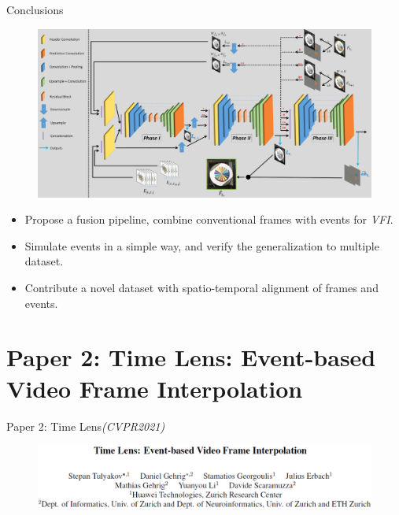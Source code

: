 \documentclass[aspectratio=43]{beamer}
\begin{document}
	\begin{frame}{Conclusions}
		\begin{figure}
			\centering\includegraphics[width=0.85\linewidth]{images/EFI_NET_architecture.png}
		\end{figure}
		\begin{itemize}
			\item Propose a \alert{fusion pipeline}, combine conventional frames with \alert{events} for \textit{VFI}.
			\item \alert{Simulate events} in a simple way, and verify the \alert{generalization} to multiple dataset.
			\item \alert{Contribute a novel dataset} with spatio-temporal alignment of frames and events.
		\end{itemize}
	\end{frame}

	\section{Paper 2: Time Lens: Event-based Video Frame Interpolation}
	\begin{frame}{Paper 2: Time Lens\textit{(CVPR2021)}}
		\begin{figure}
			\centering\includegraphics[width=0.95\linewidth]{images/Time_Lens_paper.png}
		\end{figure}
	\end{frame}
	
\end{document}
